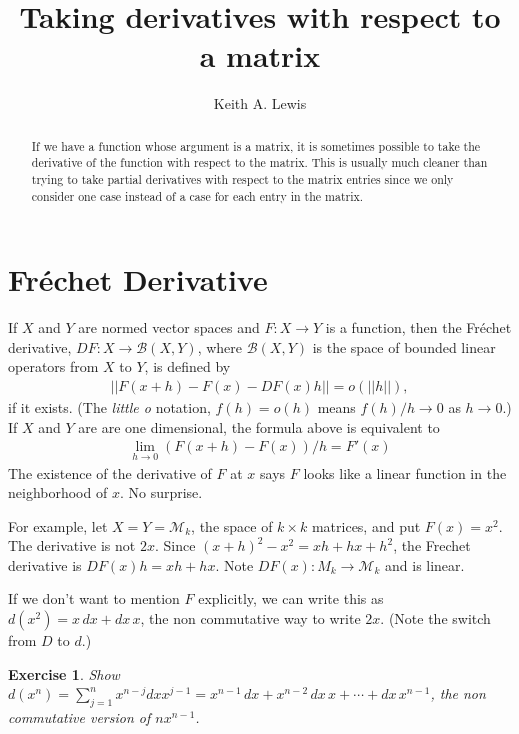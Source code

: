 \documentclass[11pt,fleqn]{amsart}
\newcommand{\B}{\mathcal B}
\newcommand{\M}{\mathcal M}
\newtheorem{ex}{Exercise}
\begin{document}
\title{Taking derivatives with respect to a matrix}
\author{Keith A. Lewis}
\address{KALX, LLC}
\begin{abstract}
If we have a function whose argument is a matrix, it is sometimes possible
to take the derivative of the function with respect to the matrix. This
is usually much cleaner than trying to take partial derivatives with
respect to the matrix entries since we only consider one case instead
of a case for each entry in the matrix.
\end{abstract}

\maketitle

\section{Fr\'echet Derivative}
If $X$ and $Y$ are normed vector spaces and $F\colon X \to Y$ is a
function, then the Fr\'echet derivative, $DF\colon X \to \B(X, Y)$,
where $\B(X,Y)$ is the space of bounded linear operators from $X$ to $Y$,
is defined by
\begin{align*}
	||F(x + h) - F(x) - DF(x)h|| = o(||h||),
\end{align*}
if it exists. (The {\em little o} notation, $f(h) = o(h)$ means
$f(h)/h \to 0$ as $h \to 0$.)
If $X$ and $Y$ are are one dimensional, the formula above is equivalent to
\begin{align*}
	\lim_{h\to 0} (F(x + h) - F(x))/h = F'(x)
\end{align*}
The existence of the derivative of $F$ at $x$ says $F$ looks like a linear
function in the neighborhood of $x$. No surprise.

For example, let $X = Y = \M_k$, the space of $k\times k$ matrices, and put
$F(x) = x^2$.  The derivative is not $2x$. Since $(x + h)^2 - x^2
= xh + hx + h^2$, the Frechet derivative is $DF(x)h = xh + hx$. Note
$DF(x)\colon M_k \to \M_k$ and is linear.

If we don't want to mention $F$ explicitly, we can write this as
$d(x^2) = x\,dx + dx\,x$, the non commutative way to write $2x$.
(Note the switch from $D$ to $d$.)

\begin{ex}
Show $d(x^n) = \sum_{j=1}^n x^{n - j} dx x^{j - 1} = x^{n-1}\, dx +
x^{n - 2}\,dx\,x + \cdots + dx\,x^{n - 1}$, the non commutative version
of $nx^{n - 1}$. 
\end{ex}
\end{document}
